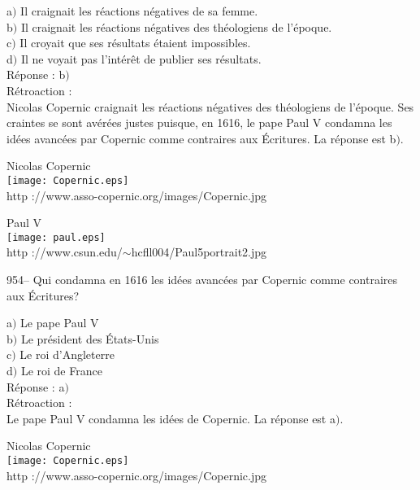 ﻿\documentclass[letterpaper, 12pt]{article}
\begin{document}
a$)$ Il craignait les r\'eactions n\'egatives de sa femme. \\
b$)$ Il craignait les r\'eactions n\'egatives des th\'eologiens de
l'\'epoque. \\
c$)$ Il croyait que ses r\'esultats \'etaient impossibles.  \\
d$)$ Il ne voyait pas l'int\'er\^et de publier ses r\'esultats. \\

R\'eponse : b$)$\\

R\'etroaction : \\
Nicolas Copernic craignait les r\'eactions n\'egatives des
th\'eologiens de l'\'epoque. Ses craintes se sont av\'er\'ees justes
puisque, en 1616, le pape Paul V condamna les id\'ees avanc\'ees par
Copernic comme \og contraires aux \'Ecritures\fg . La r\'eponse est b$)$.\\

        \begin{center}
        Nicolas Copernic\\
    \texttt{[image: Copernic.eps]}\\
        {\footnotesize http ://www.asso-copernic.org/images/Copernic.jpg}
    \end{center}

        \begin{center}
        Paul V\\
    \texttt{[image: paul.eps]}\\
        {\footnotesize http
://www.csun.edu/$\sim$hcfll004/Paul5portrait2.jpg}
    \end{center}

954-- Qui condamna en 1616 les id\'ees avanc\'ees par Copernic comme
\og contraires aux \'Ecritures\fg ?

a$)$ Le pape Paul V \\
b$)$ Le pr\'esident des \'Etats-Unis \\
c$)$ Le roi d'Angleterre  \\
d$)$ Le roi de France\\

R\'eponse : a$)$\\

R\'etroaction : \\
Le pape Paul V condamna les id\'ees de Copernic. La r\'eponse est a$)$.\\

        \begin{center}
        Nicolas Copernic\\
    \texttt{[image: Copernic.eps]}\\
        {\footnotesize http ://www.asso-copernic.org/images/Copernic.jpg}
    \end{center}
\end{document}
